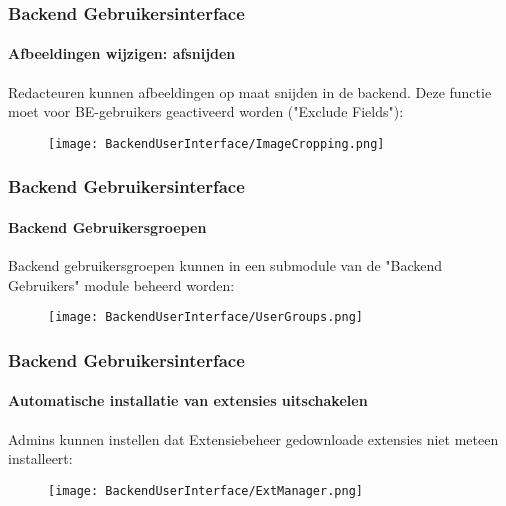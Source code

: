 \begin{frame}[fragile]
	\frametitle{Backend Gebruikersinterface}
	\framesubtitle{Afbeeldingen wijzigen: afsnijden}

	Redacteuren kunnen afbeeldingen op maat snijden in de backend. Deze functie
	moet voor BE-gebruikers geactiveerd worden ("Exclude Fields"):

	\begin{figure}
		\texttt{[image: BackendUserInterface/ImageCropping.png]}
	\end{figure}

\end{frame}

\begin{frame}[fragile]
	\frametitle{Backend Gebruikersinterface}
	\framesubtitle{Backend Gebruikersgroepen}

	Backend gebruikersgroepen kunnen in een submodule van de "Backend Gebruikers"
	module beheerd worden:

	\begin{figure}
		\texttt{[image: BackendUserInterface/UserGroups.png]}
	\end{figure}

\end{frame}

\begin{frame}[fragile]
	\frametitle{Backend Gebruikersinterface}
	\framesubtitle{Automatische installatie van extensies uitschakelen}

	Admins kunnen instellen dat Extensiebeheer gedownloade extensies
	niet meteen installeert:

	\begin{figure}
		\texttt{[image: BackendUserInterface/ExtManager.png]}
	\end{figure}

\end{frame}

